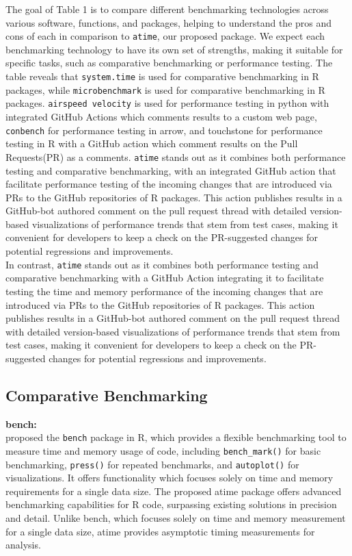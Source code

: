 \noindent The goal of Table 1 is to compare different benchmarking technologies across various software, functions, and packages, helping to understand the pros and cons of each in comparison to \texttt{atime}, our proposed package. We expect each benchmarking technology to have its own set of strengths, making it suitable for specific tasks, such as comparative benchmarking or performance testing. The table reveals that \texttt{system.time} is used for comparative benchmarking in R packages, while \texttt{microbenchmark} is used for comparative benchmarking in R packages. \texttt{airspeed velocity} is used for performance testing in python with integrated GitHub Actions which comments results to a custom web page, \texttt{conbench} for performance testing in arrow, and touchstone for performance testing in R with a GitHub action which comment results on the Pull Requests(PR) as a comments. \texttt{atime} stands out as it combines both performance testing and comparative benchmarking, with an integrated GitHub action that facilitate performance testing of the incoming changes that are introduced via PRs to the GitHub repositories of R packages. This action publishes results in a GitHub-bot authored comment on the pull request thread with detailed version-based visualizations of performance trends that stem from test cases, making it convenient for developers to keep a check on the PR-suggested changes for potential regressions and improvements. \\


In contrast, \texttt{atime} stands out as it combines both performance testing and comparative benchmarking with a GitHub Action integrating it to facilitate testing the time and memory performance of the incoming changes that are introduced via PRs to the GitHub repositories of R packages. This action publishes results in a GitHub-bot authored comment on the pull request thread with detailed version-based visualizations of performance trends that stem from test cases, making it convenient for developers to keep a check on the PR-suggested changes for potential regressions and improvements.\\

\subsection{Comparative Benchmarking}

\textbf{bench:} \\
\citet{bench} proposed the \texttt{bench} package in R, which provides a flexible benchmarking tool to measure time and memory usage of code, including \texttt{bench\_mark()} for basic benchmarking, \texttt{press()} for repeated benchmarks, and \texttt{autoplot()} for visualizations. It offers functionality which focuses solely on time and memory requirements for a single data size. The proposed atime package offers advanced benchmarking capabilities for R code, surpassing existing solutions in precision and detail. Unlike bench, which focuses solely on time and memory measurement for a single data size, atime provides asymptotic timing measurements for analysis.
\vspace{0.1in}

